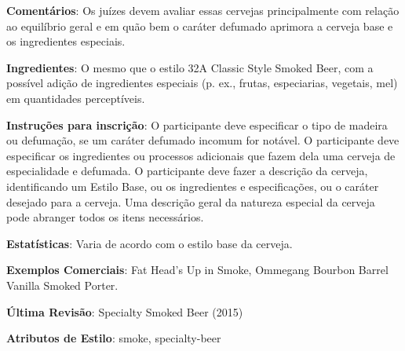 \textbf{Comentários}: Os juízes devem avaliar essas cervejas principalmente com relação ao equilíbrio geral e em quão bem o caráter defumado aprimora a cerveja base e os ingredientes especiais.

\textbf{Ingredientes}: O mesmo que o estilo 32A Classic Style Smoked Beer, com a possível adição de ingredientes especiais (p. ex., frutas, especiarias, vegetais, mel) em quantidades perceptíveis.

\textbf{Instruções para inscrição}: O participante deve especificar o tipo de madeira ou defumação, se um caráter defumado incomum for notável. O participante deve especificar os ingredientes ou processos adicionais que fazem dela uma cerveja de especialidade e defumada. O participante deve fazer a descrição da cerveja, identificando um Estilo Base, ou os ingredientes e especificações, ou o caráter desejado para a cerveja. Uma descrição geral da natureza especial da cerveja pode abranger todos os itens necessários.

\textbf{Estatísticas}: Varia de acordo com o estilo base da cerveja.

\textbf{Exemplos Comerciais}: Fat Head’s Up in Smoke, Ommegang Bourbon Barrel Vanilla Smoked Porter.

\textbf{Última Revisão}: Specialty Smoked Beer (2015)

\textbf{Atributos de Estilo}: smoke, specialty-beer
